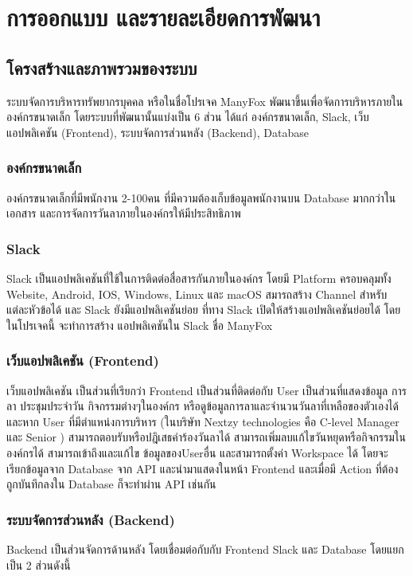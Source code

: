 \chapter{การออกแบบ และรายละเอียดการพัฒนา}
\label{chapter:experiment}
\section{โครงสร้างและภาพรวมของระบบ}
ระบบจัดการบริหารทรัพยากรบุคคล หรือในชื่อโปรเจค ManyFox พัฒนาขึ้นเพื่อจัดการบริหารภายในองค์กรขนาดเล็ก
โดยระบบที่พัฒนานั้นแบ่งเป็น 6 ส่วน ได้แก่ องค์กรขนาดเล็ก, Slack, เว็บแอปพลิเคชัน (Frontend), ระบบจัดการส่วนหลัง (Backend), Database

\subsection{องค์กรขนาดเล็ก}
องค์กรขนาดเล็กที่มีพนักงาน 2-100คน ที่มีความต้องเก็บข้อมูลพนักงานบน Database มากกว่าในเอกสาร และการจัดการวันลาภายในองค์กรให้มีประสิทธิภาพ
\subsection{Slack}
Slack เป็นแอปพลิเคชันที่ใช้ในการติดต่อสื่อสารกันภายในองค์กร โดยมี Platform ครอบคลุมทั้ง Website, Android, IOS, Windows, Linux และ macOS สมารถสร้าง Channel สำหรับแต่ละหัวข้อได้
และ Slack ยังมีแอปพลิเคชันย่อย ที่ทาง Slack เปิดให้สร้างแอปพลิเคชันย่อยได้ โดยในโปรเจคนี้ จะทำการสร้าง แอปพลิเคชันใน Slack ชื่อ ManyFox

\subsection{เว็บแอปพลิเคชัน (Frontend)}
เว็บแอปพลิเคชัน เป็นส่วนที่เรียกว่า Frontend เป็นส่วนที่ติดต่อกับ User เป็นส่วนที่แสดงข้อมูล การลา ประชุมประจำวัน กิจกรรมต่างๆในองค์กร
หรือดูข้อมูลการลาและจำนวนวันลาที่เหลือของตัวเองได้ และหาก User ที่มีตำแหน่งการบริหาร (ในบริษัท Nextzy technologies คือ C-level Manager และ Senior )
สามารถตอบรับหรือปฎิเสธคำร้องวันลาได้ สามารถเพิ่มลบแก้ไขวันหยุดหรือกิจกรรมในองค์กรได้ สามารถเข้าถึงและแก้ไข ข้อมูลของUserอื่น และสามารถตั้งค่า Workspace ได้ โดยจะเรียกข้อมูลจาก Database จาก API
และนำมาแสดงในหน้า Frontend และเมื่อมี Action ที่ต้องถูกบันทึกลงใน Database ก็จะทำผ่าน API เช่นกัน



\subsection{ระบบจัดการส่วนหลัง (Backend)}
Backend เป็นส่วนจัดการด้านหลัง โดยเชื่อมต่อกับกับ Frontend Slack และ Database โดยแยกเป็น 2 ส่วนดังนี้

